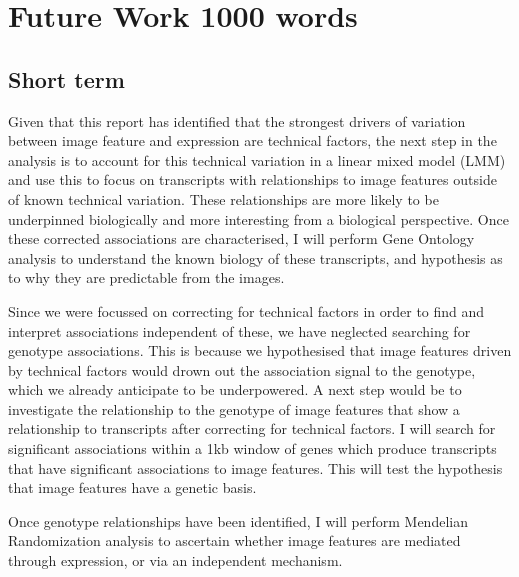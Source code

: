 \documentclass[graybox]{svmult}
\begin{document}
\section{Future Work 1000 words}



\subsection{Short term}

Given that this report has identified that the strongest drivers of variation between image feature and expression are technical factors, the next step in the analysis is to account for this technical variation in a linear mixed model (LMM) and use this to focus on transcripts with relationships to image features outside of known technical variation. These relationships are more likely to be underpinned biologically and more interesting from a biological perspective. Once these corrected associations are characterised, I will perform Gene Ontology analysis to understand the known biology of these transcripts, and hypothesis as to why they are predictable from the images.

Since we were focussed on correcting for technical factors in order to find and interpret associations independent of these, we have neglected searching for genotype associations. This is because we hypothesised that image features driven by technical factors would drown out the association signal to the genotype, which we already anticipate to be underpowered. A next step would be to investigate the relationship to the genotype of image features that show a relationship to transcripts after correcting for technical factors. I will search for significant associations within a 1kb window of genes which produce transcripts that have significant associations to image features. This will test the hypothesis that image features have a genetic basis.

Once genotype relationships have been identified, I will perform Mendelian Randomization \cite{mendelian-randomization} analysis to ascertain whether image features are mediated through expression, or via an independent mechanism.
\end{document}
